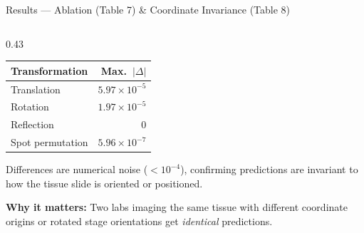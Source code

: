 \documentclass[aspectratio=169,12pt]{beamer}
\begin{document}
\begin{frame}[shrink=12]{Results — Ablation (Table 7) \& Coordinate Invariance (Table 8)}
\begin{columns}[T]
\begin{column}{0.43\textwidth}
\medskip
\begin{tabular}{l r}
\toprule
Transformation & Max.\ $|\Delta|$ \\
\midrule
Translation      & $5.97\!\times\!10^{-5}$ \\
Rotation         & $1.97\!\times\!10^{-5}$ \\
Reflection       & $0$ \\
Spot permutation & $5.96\!\times\!10^{-7}$ \\
\bottomrule
\end{tabular}

\bigskip
{\footnotesize
Differences are numerical noise ($<\!10^{-4}$), confirming predictions are invariant to how the tissue slide is oriented or positioned.

\medskip
\textbf{Why it matters:} Two labs imaging the same tissue with different coordinate origins or rotated stage orientations get \emph{identical} predictions.
}
\end{column}

\end{columns}

\end{frame}
\end{document}
